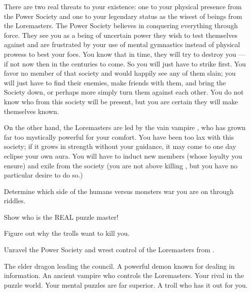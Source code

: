 \documentclass[char]{guildcamp2}
\begin{document}
There are two real threats to your existence: one to your physical presence from the Power Society and one to your legendary status as the wisest of beings from the Loremasters. The Power Society believes in conquering everything through force. They see you as a being of uncertain power they wish to test themselves against and are frustrated by your use of mental gymnastics instead of physical prowess to best your foes. You know that in time, they will try to destroy you --- if not now then in the centuries to come. So you will just have to strike first. You favor no member of that society and would happily see any of them slain; you will just have to find their enemies, make friends with them, and bring the Society down, or perhaps more simply turn them against each other. You do not know who from this society will be present, but you are certain they will make themselves known.

On the other hand, the Loremasters are led by the vain vampire \cVampire{\intro}, who has grown far too mystically powerful for your comfort. You have been too lax with this society; if it grows in strength without your guidance, it may come to one day eclipse your own aura. You will have to induct new members (whose loyalty you ensure) and exile \cVampire{\intro} from the society (you are not above killing \cVampire{\them}, but you have no particular desire to do so.)

\begin{itemz}[Goals]
  \item Determine which side of the humans versus monsters war you are on through riddles.
  \item Show \cMinotaur{} who is the REAL puzzle master!
  \item Figure out why the trolls want to kill you.
  \item Unravel the Power Society and wrest control of the Loremasters from \cVampire{\intro}.
\end{itemz}

\begin{contacts}
  \contact{\cOnyx{}} The elder dragon leading the council.
  \contact{\cDemon{}} A powerful demon known for dealing in information.  \contact{\cSphinx{}} An ancient vampire who controls the Loremasters.
  \contact{\cMinotaur{}} Your rival in the puzzle world. Your mental puzzles are far superior.
  \contact{\cTroll{}} A troll who has it out for you.
\end{contacts}
\end{document}
